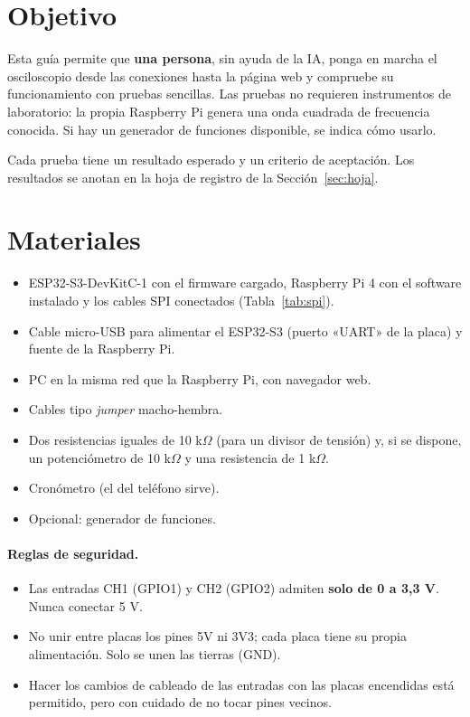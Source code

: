 \documentclass[12pt,a4paper]{article}
\begin{document}

\tableofcontents
\newpage

\section{Objetivo}

Esta guía permite que \textbf{una persona}, sin ayuda de la IA, ponga en marcha el osciloscopio desde las conexiones hasta la página web y compruebe su funcionamiento con pruebas sencillas. Las pruebas no requieren instrumentos de laboratorio: la propia Raspberry Pi genera una onda cuadrada de frecuencia conocida. Si hay un generador de funciones disponible, se indica cómo usarlo.

Cada prueba tiene un resultado esperado y un criterio de aceptación. Los resultados se anotan en la hoja de registro de la Sección~\ref{sec:hoja}.

\section{Materiales}

\begin{itemize}
  \item ESP32-S3-DevKitC-1 con el firmware cargado, Raspberry Pi 4 con el software instalado y los cables SPI conectados (Tabla~\ref{tab:spi}).
  \item Cable micro-USB para alimentar el ESP32-S3 (puerto «UART» de la placa) y fuente de la Raspberry Pi.
  \item PC en la misma red que la Raspberry Pi, con navegador web.
  \item Cables tipo \emph{jumper} macho-hembra.
  \item Dos resistencias iguales de 10 k$\Omega$ (para un divisor de tensión) y, si se dispone, un potenciómetro de 10 k$\Omega$ y una resistencia de 1 k$\Omega$.
  \item Cronómetro (el del teléfono sirve).
  \item Opcional: generador de funciones.
\end{itemize}

\paragraph{Reglas de seguridad.}
\begin{itemize}
  \item Las entradas CH1 (GPIO1) y CH2 (GPIO2) admiten \textbf{solo de 0 a 3{,}3 V}. Nunca conectar 5 V.
  \item No unir entre placas los pines 5V ni 3V3; cada placa tiene su propia alimentación. Solo se unen las tierras (GND).
  \item Hacer los cambios de cableado de las entradas con las placas encendidas está permitido, pero con cuidado de no tocar pines vecinos.
\end{itemize}
\end{document}
